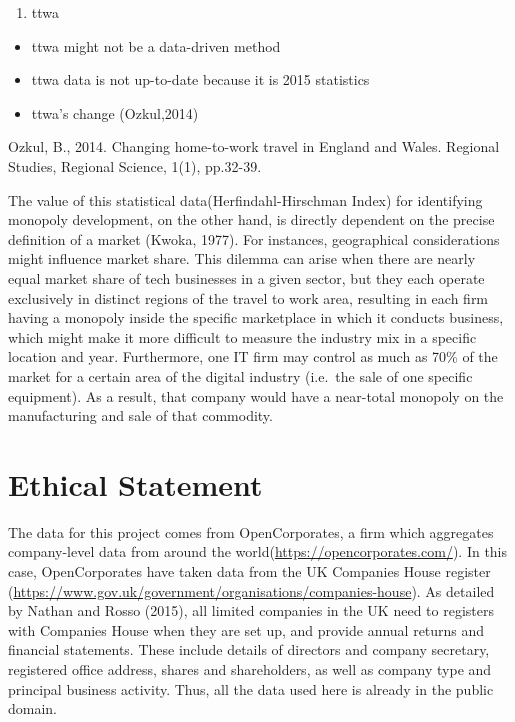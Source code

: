 \documentclass[
  12pt,
  oneside]{book}
\providecommand{\tightlist}{%
  \setlength{\itemsep}{0pt}\setlength{\parskip}{0pt}}
\begin{document}
\begin{enumerate}
\def\labelenumi{\arabic{enumi}.}
\tightlist
\item
  ttwa
\end{enumerate}

\begin{itemize}
\tightlist
\item
  ttwa might not be a data-driven method
\item
  ttwa data is not up-to-date because it is 2015 statistics
\item
  ttwa's change (Ozkul,2014)
\end{itemize}

Ozkul, B., 2014. Changing home-to-work travel in England and Wales. Regional Studies, Regional Science, 1(1), pp.32-39.

The value of this statistical data(Herfindahl-Hirschman Index) for identifying monopoly development, on the other hand, is directly dependent on the precise definition of a market (Kwoka, 1977). For instances, geographical considerations might influence market share. This dilemma can arise when there are nearly equal market share of tech businesses in a given sector, but they each operate exclusively in distinct regions of the travel to work area, resulting in each firm having a monopoly inside the specific marketplace in which it conducts business, which might make it more difficult to measure the industry mix in a specific location and year. Furthermore, one IT firm may control as much as 70\% of the market for a certain area of the digital industry (i.e.~the sale of one specific equipment). As a result, that company would have a near-total monopoly on the manufacturing and sale of that commodity.

\hypertarget{ethical-statement}{%
\section{Ethical Statement}\label{ethical-statement}}

The data for this project comes from OpenCorporates, a firm which aggregates company-level data from around the world(\url{https://opencorporates.com/}). In this case, OpenCorporates have taken data from the UK Companies House register (\url{https://www.gov.uk/government/organisations/companies-house}). As detailed by Nathan and Rosso (2015), all limited companies in the UK need to registers with Companies House when they are set up, and provide annual returns and financial statements. These include details of directors and company secretary, registered office address, shares and shareholders, as well as company type and principal business activity. Thus, all the data used here is already in the public domain.
\end{document}
